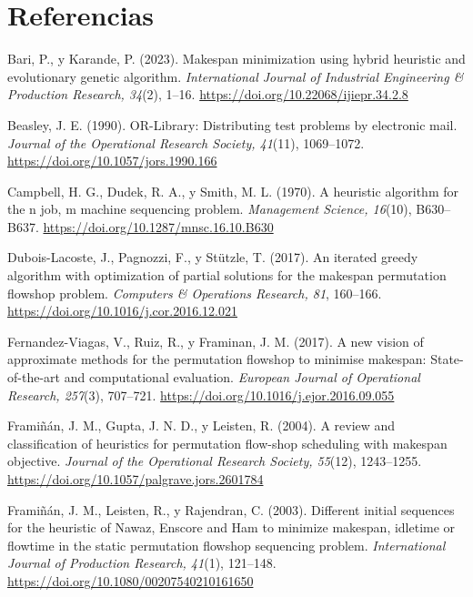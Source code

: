 \section{Referencias}
\begin{list}{}{\setlength{\leftmargin}{0.5in}\setlength{\itemindent}{-0.5in}%
  \setlength{\itemsep}{0pt}\setlength{\parsep}{0pt}\setlength{\topsep}{0pt}}

\item Bari, P., y Karande, P. (2023). Makespan minimization using hybrid heuristic and
evolutionary genetic algorithm. \textit{International Journal of Industrial Engineering \&
Production Research, 34}(2), 1--16. \url{https://doi.org/10.22068/ijiepr.34.2.8}

\item Beasley, J. E. (1990). OR-Library: Distributing test problems by electronic mail.
\textit{Journal of the Operational Research Society, 41}(11), 1069--1072.
\url{https://doi.org/10.1057/jors.1990.166}

\item Campbell, H. G., Dudek, R. A., y Smith, M. L. (1970). A heuristic algorithm for the n
job, m machine sequencing problem. \textit{Management Science, 16}(10), B630--B637.
\url{https://doi.org/10.1287/mnsc.16.10.B630}

\item Dubois-Lacoste, J., Pagnozzi, F., y Stützle, T. (2017). An iterated greedy algorithm
with optimization of partial solutions for the makespan permutation flowshop problem.
\textit{Computers \& Operations Research, 81}, 160--166.
\url{https://doi.org/10.1016/j.cor.2016.12.021}

\item Fernandez-Viagas, V., Ruiz, R., y Framinan, J. M. (2017). A new vision of approximate
methods for the permutation flowshop to minimise makespan: State-of-the-art and computational
evaluation. \textit{European Journal of Operational Research, 257}(3), 707--721.
\url{https://doi.org/10.1016/j.ejor.2016.09.055}

\item Framiñán, J. M., Gupta, J. N. D., y Leisten, R. (2004). A review and classification of
heuristics for permutation flow-shop scheduling with makespan objective. \textit{Journal of the
Operational Research Society, 55}(12), 1243--1255.
\url{https://doi.org/10.1057/palgrave.jors.2601784}

\item Framiñán, J. M., Leisten, R., y Rajendran, C. (2003). Different initial sequences for the
heuristic of Nawaz, Enscore and Ham to minimize makespan, idletime or flowtime in the static
permutation flowshop sequencing problem. \textit{International Journal of Production Research,
41}(1), 121--148. \url{https://doi.org/10.1080/00207540210161650}


\end{list}
